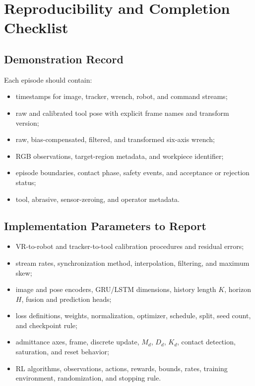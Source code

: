 \appendix
\chapter{Reproducibility and Completion Checklist}
\label{chap:appendix}

\section{Demonstration Record}
Each episode should contain:
\begin{itemize}
  \item timestamps for image, tracker, wrench, robot, and command streams;
  \item raw and calibrated tool pose with explicit frame names and transform version;
  \item raw, bias-compensated, filtered, and transformed six-axis wrench;
  \item RGB observations, target-region metadata, and workpiece identifier;
  \item episode boundaries, contact phase, safety events, and acceptance or rejection status;
  \item tool, abrasive, sensor-zeroing, and operator metadata.
\end{itemize}

\section{Implementation Parameters to Report}
\begin{itemize}
  \item VR-to-robot and tracker-to-tool calibration procedures and residual errors;
  \item stream rates, synchronization method, interpolation, filtering, and maximum skew;
  \item image and pose encoders, GRU/LSTM dimensions, history length \(K\), horizon \(H\), fusion and prediction heads;
  \item loss definitions, weights, normalization, optimizer, schedule, split, seed count, and checkpoint rule;
  \item admittance axes, frame, discrete update, \(M_d\), \(D_d\), \(K_d\), contact detection, saturation, and reset behavior;
  \item RL algorithms, observations, actions, rewards, bounds, rates, training environment, randomization, and stopping rule.
\end{itemize}

